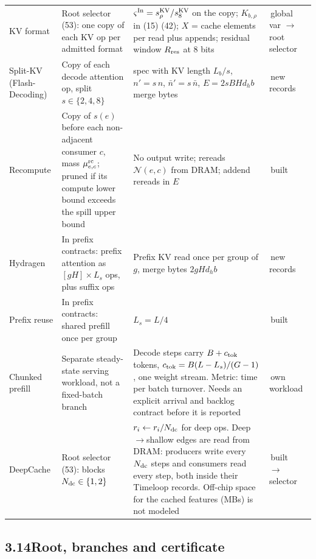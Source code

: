 \documentclass[10pt]{article}
\newcommand{\badge}[2]{{\footnotesize\sffamily\colorbox{#1bg}{\textcolor{#1}{\,#2\,}}}}
\renewcommand{\_}{\textunderscore\allowbreak}
\begin{document}
\begin{xltabular}{\textwidth}{@{}l >{\hsize\raggedright\arraybackslash}X >{\hsize\raggedright\arraybackslash}X l@{}}
KV format & Root selector (53): one copy of each KV op per admitted format & $\varsigma^{\rm In}=s^{\rm KV}_\rho/s^{\rm KV}_8$ on the copy; $K_{b,\allowbreak{}\rho}$ in (15) (42); $X$ = cache elements per read plus appends; residual window $R_{\rm res}$ at 8 bits & \badge{newc}{global var $\to$ root selector}\\
Split-KV (Flash-Decoding) & Copy of each decode attention op, split $s\in\{2,\allowbreak{}4,\allowbreak{}8\}$ & spec with KV length $L_b/s$, $n'=s\,\allowbreak{}n$, $\bar n'=s\,\allowbreak{}\bar n$, $E=2sBHd_hb$ merge bytes & \badge{datac}{new records}\\
Recompute & Copy of $s(e)$ before each non-adjacent consumer $c$, mass $\mu^{\rm rc}_{e,\allowbreak{}c}$; pruned if its compute lower bound exceeds the spill upper bound & No output write; rereads $\mathcal N(e,\allowbreak{}c)$ from DRAM; addend rereads in $E$ & \badge{built}{built}\\
Hydragen & In prefix contracts: prefix attention as $[gH]\times L_s$ ops, plus suffix ops & Prefix KV read once per group of $g$, merge bytes $2gHd_hb$ & \badge{datac}{new records}\\
Prefix reuse & In prefix contracts: shared prefill once per group & $L_s=L/4$ & \badge{built}{built}\\
Chunked prefill & Separate steady-state serving workload, not a fixed-batch branch & Decode steps carry $B+c_{\rm tok}$ tokens, $c_{\rm tok}=B(L-L_s)/(G-1)$, one weight stream. Metric: time per batch turnover. Needs an explicit arrival and backlog contract before it is reported & \badge{newc}{own workload}\\
DeepCache & Root selector (53): blocks $N_{\rm dc}\in\{1,\allowbreak{}2\}$ & $r_i\leftarrow r_i/N_{\rm dc}$ for deep ops. Deep$\to$shallow edges are read from DRAM: producers write every $N_{\rm dc}$ steps and consumers read every step, both inside their Timeloop records. Off-chip space for the cached features (MBs) is not modeled & \badge{built}{built} \badge{newc}{$\to$ selector}\\
\bottomrule\end{xltabular}\endgroup
 
\subsection*{3.14\quad Root, branches and certificate}
 
\begin{center}\end{center}
 
\end{document}
